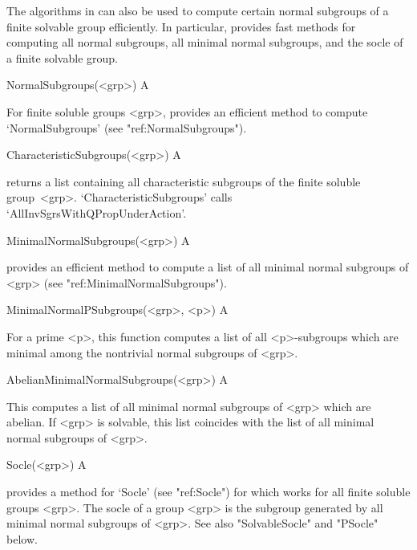 
The algorithms in {\CRISP} can also be used to compute certain normal subgroups of a finite solvable
group efficiently. In particular, {\CRISP} provides fast methods for computing all normal subgroups, all minimal normal subgroups, and the socle of a finite solvable group. 


\null

\>NormalSubgroups(<grp>) A

For finite soluble groups <grp>, {\CRISP} provides an efficient method to compute `NormalSubgroups' (see "ref:NormalSubgroups"). 

\>CharacteristicSubgroups(<grp>) A

returns a list containing all characteristic subgroups of the finite soluble group~<grp>. 
`CharacteristicSubgroups' calls `AllInvSgrsWithQPropUnderAction'.

\>MinimalNormalSubgroups(<grp>) A

\relax
{\CRISP} provides an efficient method to compute a list of all minimal normal subgroups of <grp> (see "ref:MinimalNormalSubgroups"). 


\>MinimalNormalPSubgroups(<grp>, <p>) A

\relax
For a prime <p>, this function computes a list of all <p>-subgroups which are minimal among the nontrivial
normal subgroups of <grp>. 

\>AbelianMinimalNormalSubgroups(<grp>) A

\relax
This computes a list of all minimal normal subgroups of <grp> which are abelian. If <grp> is solvable, this list coincides with the list of all 
minimal normal subgroups of <grp>.

\null

\>Socle(<grp>) A

{\CRISP} provides a method for `Socle' (see "ref:Socle") for which works for 
all finite soluble groups <grp>. The socle of a group <grp> is the subgroup 
generated by all minimal normal subgroups of <grp>. See also "SolvableSocle" and 
"PSocle" below.

